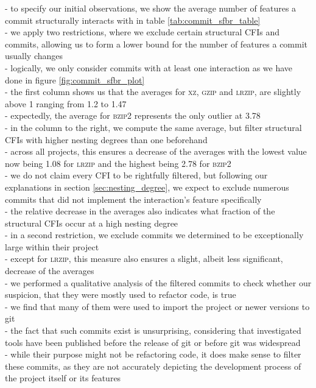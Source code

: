 - to specify our initial observations, we show the average number of features a commit structurally interacts with in table \ref{tab:commit_sfbr_table} \\
- we apply two restrictions, where we exclude certain structural CFIs and commits, allowing us to form a lower bound for the number of features a commit usually changes \\ 
- logically, we only consider commits with at least one interaction as we have done in figure \ref{fig:commit_sfbr_plot} \\
- the first column shows us that the averages for \textsc{xz}, \textsc{gzip} and \textsc{lrzip}, are slightly above 1 ranging from 1.2 to 1.47 \\
- expectedly, the average for \textsc{bzip2} represents the only outlier at 3.78 \\
- in the column to the right, we compute the same average, but filter structural CFIs with higher nesting degrees than one beforehand \\
- across all projects, this ensures a decrease of the averages with the lowest value now being 1.08 for \textsc{lrzip} and the highest being 2.78 for \textsc{bzip2} \\
- we do not claim every CFI to be rightfully filtered, but following our explanations in section \ref{sec:nesting_degree}, we expect to exclude numerous commits that did not implement the interaction's feature specifically \\ 
- the relative decrease in the averages also indicates what fraction of the structural CFIs occur at a high nesting degree \\
- in a second restriction, we exclude commits we determined to be exceptionally large within their project \\
- except for \textsc{lrzip}, this measure also ensures a slight, albeit less significant, decrease of the averages \\ 
- we performed a qualitative analysis of the filtered commits to check whether our suspicion, that they were mostly used to refactor code, is true \\
- we find that many of them were used to import the project or newer versions to git \\
- the fact that such commits exist is unsurprising, considering that investigated tools have been published before the release of git or before git was widespread \\
- while their purpose might not be refactoring code, it does make sense to filter these commits, as they are not accurately depicting the development process of the project itself or its features \\
